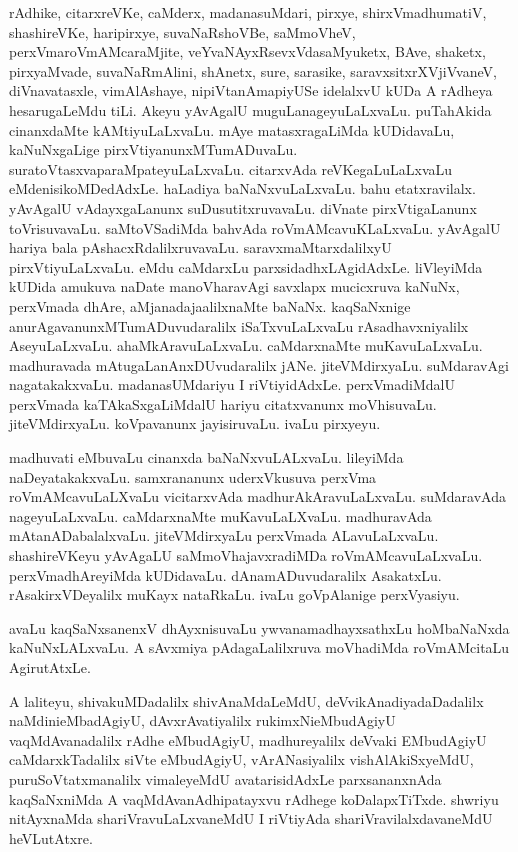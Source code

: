 \documentclass{article}
\begin{document}
\begin{mn}%
rAdhike, citarxreVKe, caMderx, madanasuMdari, pirxye, shirxVmadhumatiV, shashireVKe, 
haripirxye, suvaNaRshoVBe, saMmoVheV, perxVmaroVmAMcaraMjite, veYvaNAyxRsevxVdasaMyuketx, 
BAve, shaketx, pirxyaMvade, suvaNaRmAlini, shAnetx, sure, sarasike, 
saravxsitxrXVjiVvaneV, diVnavatasxle, vimAlAshaye, nipiVtanAmapiyUSe idelalxvU kUDa A 
rAdheya hesarugaLeMdu tiLi. Akeyu yAvAgalU muguLanageyuLaLxvaLu. puTahAkida cinanxdaMte 
kAMtiyuLaLxvaLu. mAye matasxragaLiMda kUDidavaLu, kaNuNxgaLige pirxVtiyanunxMTumADuvaLu. 
suratoVtasxvaparaMpateyuLaLxvaLu. citarxvAda reVKegaLuLaLxvaLu eMdenisikoMDedAdxLe. 
haLadiya baNaNxvuLaLxvaLu. bahu etatxravilalx. yAvAgalU vAdayxgaLanunx 
suDusutitxruvavaLu. diVnate pirxVtigaLanunx toVrisuvavaLu. saMtoVSadiMda bahvAda 
roVmAMcavuKLaLxvaLu. yAvAgalU hariya bala pAshacxRdalilxruvavaLu. saravxmaMtarxdalilxyU 
pirxVtiyuLaLxvaLu. eMdu caMdarxLu parxsidadhxLAgidAdxLe. liVleyiMda kUDida amukuva naDate 
manoVharavAgi savxlapx mucicxruva kaNuNx, perxVmada dhAre, aMjanadajaalilxnaMte baNaNx. 
kaqSaNxnige anurAgavanunxMTumADuvudaralilx iSaTxvuLaLxvaLu rAsadhavxniyalilx 
AseyuLaLxvaLu. ahaMkAravuLaLxvaLu. caMdarxnaMte muKavuLaLxvaLu. madhuravada 
mAtugaLanAnxDUvudaralilx jANe. jiteVMdirxyaLu. suMdaravAgi nagatakakxvaLu. madanasUMdariyu 
I riVtiyidAdxLe. perxVmadiMdalU perxVmada kaTAkaSxgaLiMdalU hariyu citatxvanunx 
moVhisuvaLu. jiteVMdirxyaLu. koVpavanunx jayisiruvaLu. ivaLu pirxyeyu.
\end{mn}

\begin{mn}%
madhuvati eMbuvaLu cinanxda baNaNxvuLALxvaLu. lileyiMda naDeyatakakxvaLu. samxrananunx 
uderxVkusuva perxVma roVmAMcavuLaLXvaLu vicitarxvAda madhurAkAravuLaLxvaLu. suMdaravAda 
nageyuLaLxvaLu. caMdarxnaMte muKavuLaLXvaLu. madhuravAda mAtanADabalalxvaLu. 
jiteVMdirxyaLu perxVmada ALavuLaLxvaLu. shashireVKeyu yAvAgaLU saMmoVhajavxradiMDa 
roVmAMcavuLaLxvaLu. perxVmadhAreyiMda kUDidavaLu. dAnamADuvudaralilx AsakatxLu. 
rAsakirxVDeyalilx muKayx nataRkaLu. ivaLu goVpAlanige perxVyasiyu.
\end{mn}

\begin{mn}%
avaLu kaqSaNxsanenxV dhAyxnisuvaLu ywvanamadhayxsathxLu hoMbaNaNxda kaNuNxLALxvaLu. A 
sAvxmiya pAdagaLalilxruva moVhadiMda roVmAMcitaLu AgirutAtxLe.
\end{mn}

\begin{mn}%
A laliteyu, shivakuMDadalilx shivAnaMdaLeMdU, deVvikAnadiyadaDadalilx naMdinieMbadAgiyU, 
dAvxrAvatiyalilx rukimxNieMbudAgiyU vaqMdAvanadalilx rAdhe eMbudAgiyU, madhureyalilx 
deVvaki EMbudAgiyU caMdarxkTadalilx siVte eMbudAgiyU, vArANasiyalilx vishAlAkiSxyeMdU,
puruSoVtatxmanalilx vimaleyeMdU avatarisidAdxLe parxsananxnAda kaqSaNxniMda A 
vaqMdAvanAdhipatayxvu rAdhege koDalapxTiTxde. shwriyu nitAyxnaMda shariVravuLaLxvaneMdU I 
riVtiyAda shariVravilalxdavaneMdU heVLutAtxre.
\end{mn}
\end{document}
